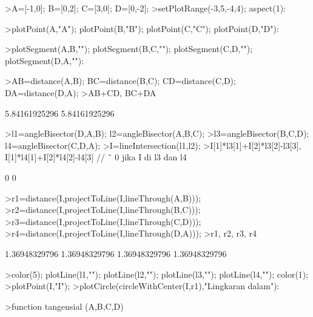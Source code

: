 \documentclass[a4paper,10pt]{article}
\begin{document}
\begin{eulernotebook}
\begin{eulercomment}
\begin{eulercomment}
\begin{eulercomment}
\begin{eulercomment}
\begin{eulercomment}
\begin{eulercomment}
\begin{eulerprompt}
\end{eulerprompt}
\begin{eulerprompt}
>A=[-1,0]; B=[0,2]; C=[3,0]; D=[0,-2];
>setPlotRange(-3,5,-4,4); aspect(1):
\end{eulerprompt}
\begin{eulerprompt}
>plotPoint(A,"A"); plotPoint(B,"B"); plotPoint(C,"C"); plotPoint(D,"D"):
\end{eulerprompt}
\begin{eulerprompt}
>plotSegment(A,B,""); plotSegment(B,C,""); plotSegment(C,D,""); plotSegment(D,A,""): 
\end{eulerprompt}
\begin{eulerprompt}
>AB=distance(A,B); BC=distance(B,C); CD=distance(C,D); DA=distance(D,A);
>AB+CD, BC+DA 
\end{eulerprompt}
\begin{euleroutput}
  5.84161925296
  5.84161925296
\end{euleroutput}
\begin{eulerprompt}
>l1=angleBisector(D,A,B); l2=angleBisector(A,B,C);
>l3=angleBisector(B,C,D); l4=angleBisector(C,D,A);
>I=lineIntersection(l1,l2);
>I[1]*l3[1]+I[2]*l3[2]-l3[3], I[1]*l4[1]+I[2]*l4[2]-l4[3]   // ˜ 0 jika I di l3 dan l4
\end{eulerprompt}
\begin{euleroutput}
  0
  0
\end{euleroutput}
\begin{eulerprompt}
>r1=distance(I,projectToLine(I,lineThrough(A,B)));
>r2=distance(I,projectToLine(I,lineThrough(B,C)));
>r3=distance(I,projectToLine(I,lineThrough(C,D)));
>r4=distance(I,projectToLine(I,lineThrough(D,A)));
>r1, r2, r3, r4
\end{eulerprompt}
\begin{euleroutput}
  1.36948329796
  1.36948329796
  1.36948329796
  1.36948329796
\end{euleroutput}
\begin{eulerprompt}
>color(5); plotLine(l1,""); plotLine(l2,""); plotLine(l3,""); plotLine(l4,""); color(1);
>plotPoint(I,"I");
>plotCircle(circleWithCenter(I,r1),"Lingkaran dalam"):
\end{eulerprompt}
\begin{eulerprompt}
>function tangensial (A,B,C,D)
\end{eulerprompt}

\end{eulercomment}
\end{eulercomment}
\end{eulercomment}
\end{eulercomment}
\end{eulercomment}
\end{eulercomment}
\end{eulernotebook}
\end{document}
